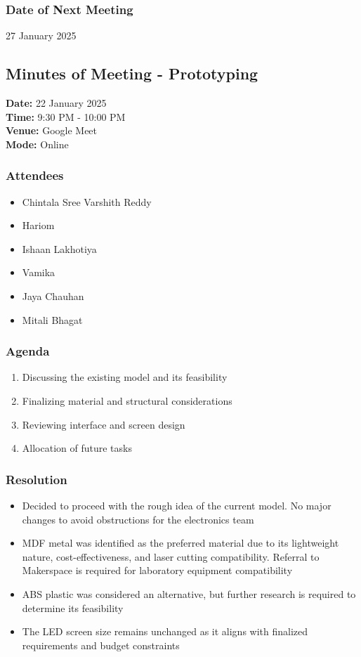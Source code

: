 \documentclass[12pt,a4paper]{article}
\begin{document}
\subsubsection*{Date of Next Meeting}
27 January 2025

\subsection*{Minutes of Meeting - Prototyping}
\noindent
\textbf{Date:} 22 January 2025\\
\textbf{Time:} 9:30 PM - 10:00 PM \\
\textbf{Venue:} Google Meet\\
\textbf{Mode:} Online \\

\subsubsection*{Attendees}
\begin{itemize}
    \item Chintala Sree Varshith Reddy
    \item Hariom
    \item Ishaan Lakhotiya
    \item Vamika
    \item Jaya Chauhan
    \item Mitali Bhagat
\end{itemize}

\subsubsection*{Agenda}
\begin{enumerate}
    \item Discussing the existing model and its feasibility
    \item Finalizing material and structural considerations
    \item Reviewing interface and screen design
    \item Allocation of future tasks
\end{enumerate}

\subsubsection*{Resolution}
\begin{itemize}
    \item Decided to proceed with the rough idea of the current model. No major changes to avoid obstructions for the electronics team
    \item MDF metal was identified as the preferred material due to its lightweight nature, cost-effectiveness, and laser cutting compatibility. Referral to Makerspace is required for laboratory equipment compatibility
    \item ABS plastic was considered an alternative, but further research is required to determine its feasibility
    \item The LED screen size remains unchanged as it aligns with finalized requirements and budget constraints
\end{itemize}
\end{document}
